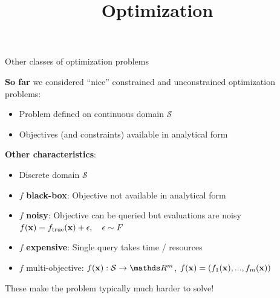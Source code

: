 \documentclass[11pt,compress,t,notes=noshow, xcolor=table]{beamer}
\title{Optimization}
\date{}
\begin{document}
\sloppy

\begin{vbframe}{Other classes of optimization problems}

\textbf{So far} we considered \enquote{nice} constrained and unconstrained optimization problems: 

\begin{itemize}
	\item Problem defined on continuous domain $\mathcal{S}$
	\item Objectives (and constraints) available in analytical form
\end{itemize}

\lz 

\textbf{Other characteristics}: 
\begin{itemize}
	\item Discrete domain $\mathcal{S}$
	\item $f$ \textbf{black-box}: Objective not available in analytical form
	\item $f$ \textbf{noisy}: Objective can be queried but evaluations are noisy $f(\mathbf{x}) = f_{\text{true}}(\mathbf{x}) + \epsilon, \quad \epsilon \sim F$
	\item $f$ \textbf{expensive}: Single query takes time / resources
	\item $f$ multi-objective: $\fx: \mathcal{S} \to \R^m$, $f(\mathbf{x}) = \left(f_1(\mathbf{x}), ..., f_m(\mathbf{x})\right)$
\end{itemize}

\lz 

These make the problem typically much harder to solve!

\end{vbframe}
\end{document}
